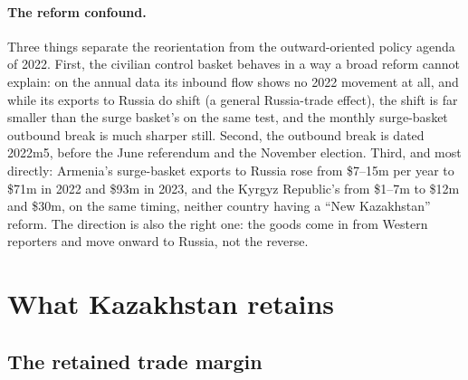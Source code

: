 \documentclass[12pt]{article}
\begin{document}
\paragraph{The reform confound.} Three things separate the reorientation from the
outward-oriented policy agenda of 2022. First, the civilian control basket behaves in a way a
broad reform cannot explain: on the annual data its inbound flow shows no 2022 movement at all, and
while its exports to Russia do shift (a general Russia-trade effect), the shift is far
smaller than the surge basket's on the same test, and the monthly surge-basket outbound break
is much sharper still. Second, the outbound
break is dated 2022m5, before the June referendum and the November election. Third, and most
directly: Armenia's surge-basket exports to Russia rose from \$7--15m per year to \$71m in
2022 and \$93m in 2023, and the Kyrgyz Republic's from \$1--7m to \$12m and \$30m, on the same
timing, neither country having a ``New Kazakhstan'' reform. The direction is also the right one: the
goods come in from Western reporters and move onward to Russia, not the reverse.

\section{What Kazakhstan retains}\label{sec:capture}

\subsection{The retained trade margin}
\end{document}
